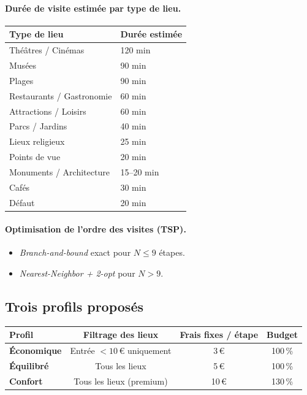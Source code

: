 \documentclass[a4paper,11pt]{article}
\begin{document}
\paragraph{Durée de visite estimée par type de lieu.}
\begin{center}
\begin{tabular}{ll}
  \toprule
  Type de lieu & Durée estimée \\
  \midrule
  Théâtres / Cinémas           & 120 min \\
  Musées                       & 90 min \\
  Plages                       & 90 min \\
  Restaurants / Gastronomie    & 60 min \\
  Attractions / Loisirs        & 60 min \\
  Parcs / Jardins              & 40 min \\
  Lieux religieux              & 25 min \\
  Points de vue                & 20 min \\
  Monuments / Architecture     & 15--20 min \\
  Cafés                        & 30 min \\
  Défaut                       & 20 min \\
  \bottomrule
\end{tabular}
\end{center}

\paragraph{Optimisation de l'ordre des visites (TSP).}
\begin{itemize}[leftmargin=1.5em]
  \item \textit{Branch-and-bound} exact pour $N \leq 9$ étapes.
  \item \textit{Nearest-Neighbor + 2-opt} pour $N > 9$.
\end{itemize}

\subsection{Trois profils proposés}

\begin{center}
\begin{tabular}{lccc}
  \toprule
  Profil & Filtrage des lieux & Frais fixes / étape & Budget \\
  \midrule
  \textbf{Économique} & Entrée $< 10$\,€ uniquement & 3\,€ & 100\,\% \\
  \textbf{Équilibré}  & Tous les lieux              & 5\,€ & 100\,\% \\
  \textbf{Confort}    & Tous les lieux (premium)    & 10\,€ & 130\,\% \\
  \bottomrule
\end{tabular}
\end{center}
\end{document}
